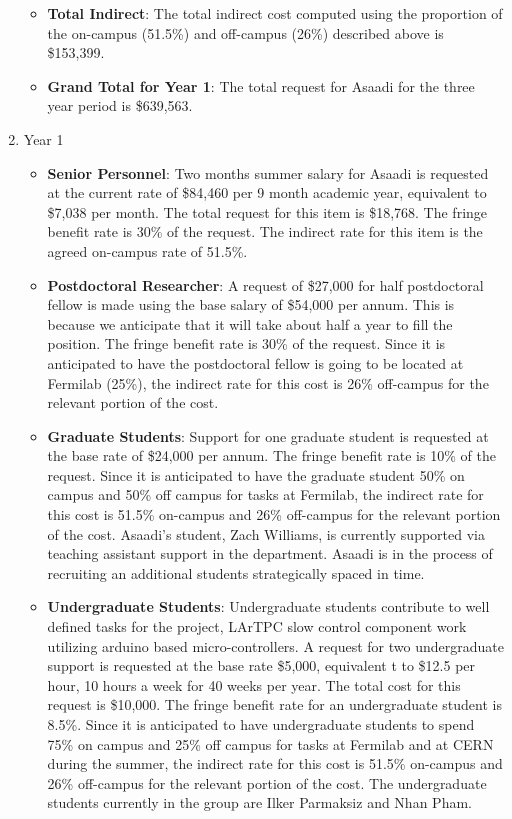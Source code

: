 \begin{enumerate}
\begin{itemize}[noitemsep,nolistsep]
\item {{\bf Total Indirect}: The total indirect cost computed using the proportion of the on-campus (51.5\%) and off-campus (26\%) described above is \$153,399.}

\item {{\bf Grand Total for Year 1}: The total request for Asaadi for the three year period is \$639,563.}

\end{itemize}

\item{Year 1}

\begin{itemize}[noitemsep,nolistsep]

\item{{\bf Senior Personnel}: Two months summer salary for Asaadi is requested at the current rate of \$84,460 per 9 month academic year, equivalent to \$7,038 per month.  The total request for this item is \$18,768.   The fringe benefit rate is 30\% of the request.  The indirect rate for this item is the agreed on-campus rate of 51.5\%.}

\item {{\bf Postdoctoral Researcher}: A request of \$27,000 for half postdoctoral fellow is made using the base salary of \$54,000 per annum. This is because we anticipate that it will take about half a year to fill the position.  The fringe benefit rate is 30\% of the request.  Since it is anticipated to have the postdoctoral fellow is going to be located at Fermilab (25\%), the indirect rate for this cost is 26\% off-campus for the relevant portion of the cost.} 

\item{{\bf Graduate Students}: Support for one graduate student is requested at the base rate of \$24,000 per annum.   The fringe benefit rate is 10\% of the request.  Since it is anticipated to have the graduate student 50\% on campus and 50\% off campus for tasks at Fermilab, the indirect rate for this cost is 51.5\% on-campus and 26\% off-campus for the relevant portion of the cost.   Asaadi’s student, Zach Williams, is currently supported via teaching assistant support in the department.   Asaadi is in the process of recruiting an additional students strategically spaced in time.}

\item {{\bf Undergraduate Students}: Undergraduate students contribute to well defined tasks for the project, LArTPC slow control component work utilizing arduino based micro-controllers.  A request for two undergraduate support is requested at the base rate \$5,000, equivalent t to \$12.5 per hour, 10 hours a week for 40 weeks per year.  The total cost for this request is \$10,000.  The fringe benefit rate for an undergraduate student is 8.5\%.  Since it is anticipated to have undergraduate students to spend 75\% on campus and 25\% off campus for tasks at Fermilab and at CERN during the summer, the indirect rate for this cost is 51.5\% on-campus and 26\% off-campus for the relevant portion of the cost.   The undergraduate students currently in the group are Ilker Parmaksiz and Nhan Pham.}


\end{itemize}
\end{enumerate}
